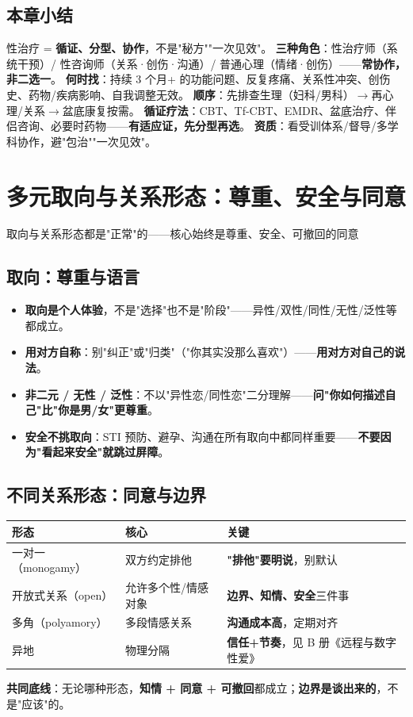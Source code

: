 \documentclass[12pt,UTF8,openany]{ctexbook}
\begin{document}
\section{本章小结}
性治疗 = \textbf{循证、分型、协作}，不是"秘方""一次见效"。
\textbf{三种角色}：性治疗师（系统干预）/ 性咨询师（关系·创伤·沟通）/ 普通心理（情绪·创伤）——\textbf{常协作，非二选一}。
\textbf{何时找}：持续 3 个月+ 的功能问题、反复疼痛、关系性冲突、创伤史、药物/疾病影响、自我调整无效。
\textbf{顺序}：先排查生理（妇科/男科）$\to$再心理/关系$\to$盆底康复按需。
\textbf{循证疗法}：CBT、Tf-CBT、EMDR、盆底治疗、伴侣咨询、必要时药物——\textbf{有适应证，先分型再选}。
\textbf{资质}：看受训体系/督导/多学科协作，避"包治""一次见效"。


\chapter{多元取向与关系形态：尊重、安全与同意}

\begin{center}
\myhei\large 取向与关系形态都是"正常"的——核心始终是尊重、安全、可撤回的同意
\end{center}

\section{取向：尊重与语言}
\begin{itemize}[leftmargin=2em,itemsep=0.3em]
  \item \textbf{取向是个人体验}，不是"选择"也不是"阶段"——异性/双性/同性/无性/泛性等都成立。
  \item \textbf{用对方自称}：别"纠正"或"归类"（"你其实没那么喜欢"）——\textbf{用对方对自己的说法}。
  \item \textbf{非二元 / 无性 / 泛性}：不以"异性恋/同性恋"二分理解——\textbf{问"你如何描述自己"比"你是男/女"更尊重}。
  \item \textbf{安全不挑取向}：STI 预防、避孕、沟通在所有取向中都同样重要——\textbf{不要因为"看起来安全"就跳过屏障}。
\end{itemize}

\section{不同关系形态：同意与边界}
\begin{tabularx}{\textwidth}{X X X}
\toprule
\textbf{形态} & \textbf{核心} & \textbf{关键} \\
\midrule
一对一（monogamy） & 双方约定排他 & \textbf{"排他"要明说}，别默认 \\
开放式关系（open） & 允许多个性/情感对象 & \textbf{边界、知情、安全}三件事 \\
多角（polyamory） & 多段情感关系 & \textbf{沟通成本高}，定期对齐 \\
异地 & 物理分隔 & \textbf{信任+节奏}，见 B 册《远程与数字性爱》 \\
\bottomrule
\end{tabularx}
\par\smallskip
\textbf{共同底线}：无论哪种形态，\textbf{知情 + 同意 + 可撤回}都成立；\textbf{边界是谈出来的}，不是"应该"的。
\end{document}

